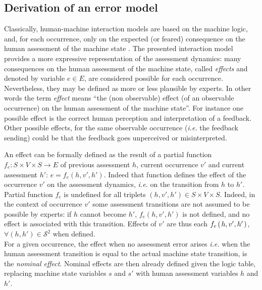 \subsection{Derivation of an error model}
Classically, human-machine interaction models 
are based on the machine logic, 
and, for each occurrence, only on the expected (or feared) 
consequence on the human assessment of the machine state 
\cite{rushby02a, pizziol14}. 
The presented interaction model provides 
a more expressive representation of the assessment dynamics: 
many consequences on the human assessment of the machine state, called {\em effects} 
and denoted by variable $e \in E $, are considered possible 
for each occurrence. Nevertheless, they may be defined as more 
or less plausible by experts. In other words the 
term {\em effect} means ``the (non observable) effect 
(of an observable occurrence) on the human assessment 
of the machine state''. For instance one possible effect 
is the correct human perception and interpretation of a feedback. 
Other possible effects, for the same observable occurrence 
(\textit{i.e.} the feedback sending) could be that the feedback goes unperceived or misinterpreted.

An effect can be formally defined as the result of a partial 
function $ f_e : S \times V \times S \rightarrow E $ of previous assessment $h$, current occurrence $v'$ and current assessment $h'$: 
$e = f_e(h,v',h')$. Indeed that function defines the effect of the occurrence 
$v'$ on the assessment dynamics, \textit{i.e.} on the transition 
from $h$ to $h'$. Partial function $f_e$ is undefined for all 
triplets $(h,v',h') \in S \times V \times S$. Indeed, in the 
context of occurrence $v'$ some assessment transitions are not 
assumed to be possible by experts:
if $h$ cannot become $h'$, $f_e(h,v',h')$ is not defined, and no effect 
is associated with this transition.
Effects of $v'$ are thus each $f_e \left( \left.  h,v',h' \right. \right)$, 
$\forall (h,h') \in \mathcal{S}^2$ when defined.\\

For a given occurrence, the effect when no assessment error arises 
\textit{i.e.} when the human assessment transition 
is equal to the actual machine state transition,
is the {\em nominal effect}.
Nominal effects are then already defined given the logic
table, replacing machine state variables $s$ and $s'$ 
with human assessment variables $h$ and $h'$.  


